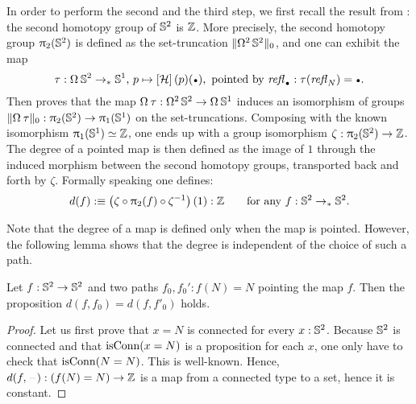 \documentclass[english,a4]{article}
\renewcommand{\ap}[1]{\left[{#1}\right]}
\newcommand{\ptdto}{\to_\ast}%
\newcommand{\setTrunc}[1]{\Trunc{#1}_0}
\begin{document}
In order to perform the second and the third step, we first recall the result
from \cite[Cor. 8.5.2]{HoTT}: the second homotopy group of ${{\mathbb S^{2}}}$ is $\mathbb{Z}$. More
precisely, the second homotopy group $\uppi_{2}({{\mathbb S^{2}}})$ is defined as the
set-truncation $\setTrunc{\loopspace 2 \Sp}$, and one can exhibit the map
\begin{displaymath}
  \tau: \loopspace\null\Sp \ptdto \Sc, \, p \mapsto \ap\hopf(p)(\base),
\text{ pointed by $\refl{\base}:\tau(\refl{N})=\base$}.
\end{displaymath}
Then \cite[Section 8.4 and 8.5]{HoTT} proves that the map $\loopspace\null\tau :
\loopspace 2 \Sp \to \loopspace \null \Sc$ induces an isomorphism of groups
$\setTrunc{\loopspace\null\tau}: \hgr 2(\Sp) \to \hgr 1(\Sc)$ on the set-truncations.
Composing with the known isomorphism $\uppi_{1}({{\mathbb S^{1}}}) \simeq \mathbb{Z}$, one
ends up with a group isomorphism $\zeta: \uppi_{2}({{\mathbb S^{2}}}) \to \mathbb{Z}$. The degree of a
pointed map is then defined as the image of $1$ through the induced morphism
between the second homotopy groups, transported back and forth by $\zeta$. 
Formally speaking one defines: 
\begin{displaymath}
  d(f) \defequi \left(\zeta\circ\hgr 2(f)\circ \inv\zeta\right)(1):\ZZ \qquad
  \text{for any}\ f:\Sp\ptdto\Sp.
\end{displaymath}

Note that the degree of a map is defined only when the map is pointed. However,
the following lemma shows that the degree is independent of the choice of such
a path.
\begin{lemma}
  Let $f: {{\mathbb S^{2}}} \to {{\mathbb S^{2}}}$ and two paths $f_0,f_0': f(N) = N$ pointing the map $f$.
  Then the proposition $d(f,f_0) = d(f,f'_0)$ holds.
  \label{lem:deg-independent-path}
\end{lemma}
\begin{proof}
  Let us first prove that $x=N$ is connected for every $x:{{\mathbb S^{2}}}$. Because ${{\mathbb S^{2}}}$
  is connected and that $\mathrm{isConn}(x=N)$ is a proposition for each $x$, one only
  have to check that $\mathrm{isConn}(N=N)$. This is well-known. Hence, $d(f,\blank) :
  (f(N) = N) \to \ZZ$ is a map from a connected type to a set, hence it is
  constant. 
\end{proof}
\end{document}
